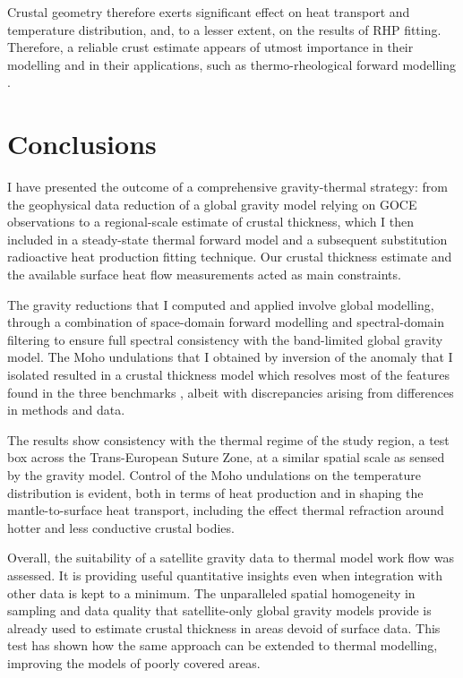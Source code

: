 Crustal geometry therefore exerts significant effect on heat transport and temperature distribution, and, to a lesser extent, on the results of RHP fitting.
Therefore, a reliable crust estimate appears of utmost importance in their modelling and in their applications, such as thermo-rheological forward modelling \parencite[e.g. ][]{Burov1995}.

\section{Conclusions}
\label{s:Appl:Concl}

I have presented the outcome of a comprehensive gravity-thermal strategy: from the geophysical data reduction of a global gravity model relying on GOCE observations to a regional-scale estimate of crustal thickness, which I then included in a steady-state thermal forward model and a subsequent substitution radioactive heat production fitting technique.
Our crustal thickness estimate and the available surface heat flow measurements acted as main constraints.

The gravity reductions that I computed and applied involve global modelling, through a combination of space-domain forward modelling and spectral-domain filtering to ensure full spectral consistency with the band-limited global gravity model.
The Moho undulations that I obtained by inversion of the anomaly that I isolated resulted in a crustal thickness model which resolves most of the features found in the three benchmarks \parencites{Grad2009}{Reguzzoni2015}{Pasyanos2014}, albeit with discrepancies arising from differences in methods and data.

The results show consistency with the thermal regime of the study region, a test box across the Trans-European Suture Zone, at a similar spatial scale as sensed by the gravity model.
Control of the Moho undulations on the temperature distribution is evident, both in terms of heat production and in shaping the mantle-to-surface heat transport, including the effect thermal refraction around hotter and less conductive crustal bodies.

Overall, the suitability of a satellite gravity data to thermal model work flow was assessed.
It is providing useful quantitative insights even when integration with other data is kept to a minimum.
The unparalleled spatial homogeneity in sampling and data quality that satellite-only global gravity models provide is already used to estimate crustal thickness in areas devoid of surface data.
This test has shown how the same approach can be extended to thermal modelling, improving the models of poorly covered areas.

